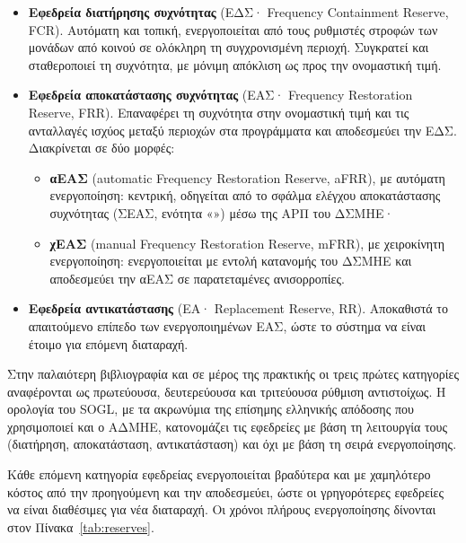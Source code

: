 \begin{itemize}
\item \textbf{Εφεδρεία διατήρησης συχνότητας} (ΕΔΣ· Frequency Containment Reserve, FCR).
      Αυτόματη και τοπική, ενεργοποιείται από τους ρυθμιστές στροφών των μονάδων από κοινού σε
      ολόκληρη τη συγχρονισμένη περιοχή. Συγκρατεί και σταθεροποιεί τη συχνότητα, με μόνιμη
      απόκλιση ως προς την ονομαστική τιμή.
\item \textbf{Εφεδρεία αποκατάστασης συχνότητας} (ΕΑΣ· Frequency Restoration Reserve, FRR).
      Επαναφέρει τη συχνότητα στην ονομαστική τιμή και τις ανταλλαγές ισχύος μεταξύ περιοχών
      στα προγράμματα και αποδεσμεύει την ΕΔΣ. Διακρίνεται σε δύο μορφές:
      \begin{itemize}
      \item \textbf{αΕΑΣ} (automatic Frequency Restoration Reserve, aFRR), με αυτόματη ενεργοποίηση: κεντρική, οδηγείται από το σφάλμα
            ελέγχου αποκατάστασης συχνότητας (ΣΕΑΣ, ενότητα «») μέσω της ΑΡΠ του
            ΔΣΜΗΕ·
      \item \textbf{χΕΑΣ} (manual Frequency Restoration Reserve, mFRR), με χειροκίνητη ενεργοποίηση: ενεργοποιείται με εντολή
            κατανομής του ΔΣΜΗΕ και αποδεσμεύει την αΕΑΣ σε παρατεταμένες ανισορροπίες.
      \end{itemize}
\item \textbf{Εφεδρεία αντικατάστασης} (ΕΑ· Replacement Reserve, RR). Αποκαθιστά το απαιτούμενο
      επίπεδο των ενεργοποιημένων ΕΑΣ, ώστε το σύστημα να είναι έτοιμο για επόμενη διαταραχή.
\end{itemize}

Στην παλαιότερη βιβλιογραφία και σε μέρος της πρακτικής οι τρεις πρώτες κατηγορίες
αναφέρονται ως πρωτεύουσα, δευτερεύουσα και τριτεύουσα ρύθμιση αντιστοίχως. Η ορολογία του
SOGL, με τα ακρωνύμια της επίσημης ελληνικής απόδοσης που χρησιμοποιεί και ο ΑΔΜΗΕ,
κατονομάζει τις εφεδρείες με βάση τη λειτουργία τους (διατήρηση, αποκατάσταση,
αντικατάσταση) και όχι με βάση τη σειρά ενεργοποίησης.

Κάθε επόμενη κατηγορία εφεδρείας ενεργοποιείται βραδύτερα και με χαμηλότερο κόστος από την
προηγούμενη και την αποδεσμεύει, ώστε οι γρηγορότερες εφεδρείες να είναι διαθέσιμες για νέα
διαταραχή. Οι χρόνοι πλήρους ενεργοποίησης δίνονται στον Πίνακα~\ref{tab:reserves}.

